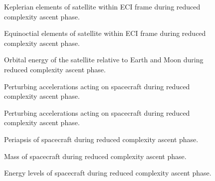 \begin{figure}
\centering
\def\svgwidth{\figurewidth}

\caption{Keplerian elements of satellite within ECI frame during reduced complexity ascent phase.}
\label{fig:Ascent2-kep}
\end{figure}

\begin{figure}
\centering
\def\svgwidth{\figurewidth}

\caption{Equinoctial elements of satellite within ECI frame during reduced complexity ascent phase.}
\label{fig:Ascent2-mee}
\end{figure}

\begin{figure}
\centering
\def\svgwidth{\figurewidth}

\caption{Orbital energy of the satellite relative to Earth and Moon during reduced complexity ascent phase.}
\label{fig:Ascent2-orbeng}
\end{figure}

\begin{figure}
\centering
\def\svgwidth{\figurewidth}

\caption{Perturbing accelerations acting on spacecraft during reduced complexity ascent phase.}
\label{fig:Ascent2-pert}
\end{figure}

\begin{figure}
\centering
\def\svgwidth{\figurewidth}

\caption{Perturbing accelerations acting on spacecraft during reduced complexity ascent phase.}
\label{fig:Ascent2-pert2}
\end{figure}


\begin{figure}
\centering
\def\svgwidth{\figurewidth}

\caption{Periapsis of spacecraft during reduced complexity ascent phase.}
\label{fig:Ascent2-peri}
\end{figure}

\begin{figure}
\centering
\def\svgwidth{\figurewidth}

\caption{Mass of spacecraft during reduced complexity ascent phase.}
\label{fig:Ascent2-mass}
\end{figure}

\begin{figure}
\centering
\def\svgwidth{\figurewidth}

\caption{Energy levels of spacecraft during reduced complexity ascent phase.}
\label{fig:Ascent2-energy}
\end{figure}

